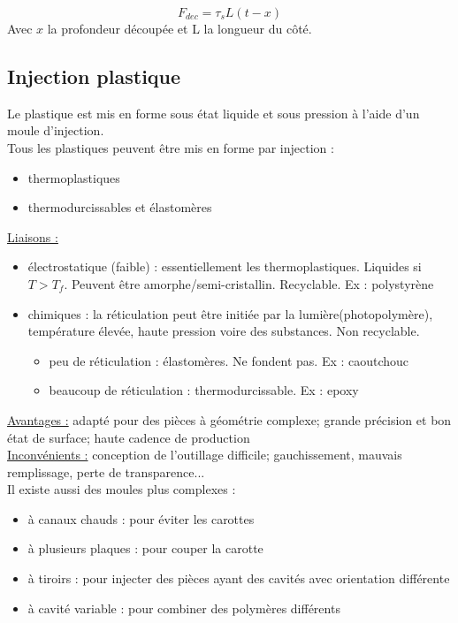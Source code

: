 \documentclass[../main.tex]{subfiles}
\begin{document}
\begin{equation}
    F_{dec} = \tau_s L (t-x)
\end{equation}
Avec $x$ la profondeur découpée et L la longueur du côté.\\

\subsection{Injection plastique}
Le plastique est mis en forme sous état liquide et sous pression à l'aide d'un moule d'injection.\\
Tous les plastiques peuvent être mis en forme par injection : \begin{itemize}
    \item thermoplastiques\\
    \item thermodurcissables et élastomères\\
\end{itemize}

\underline{Liaisons :} \begin{itemize}
    \item électrostatique (faible) : essentiellement les thermoplastiques. Liquides si $T>T_f$. Peuvent être amorphe/semi-cristallin. Recyclable. Ex : polystyrène\\
    \item chimiques : la réticulation peut être initiée par la lumière(photopolymère), température élevée, haute pression voire des substances. Non recyclable. \begin{itemize}
        \item peu de réticulation : élastomères. Ne fondent pas. Ex : caoutchouc\\
        \item beaucoup de réticulation : thermodurcissable. Ex : epoxy
    \end{itemize}
\end{itemize}

\quad \underline{Avantages :} adapté pour des pièces à géométrie complexe; grande précision et bon état de surface; haute cadence de production\\

\quad \underline{Inconvénients :} conception de l'outillage difficile; gauchissement, mauvais remplissage, perte de transparence...\\

Il existe aussi des moules plus complexes : \begin{itemize}
    \item à canaux chauds : pour éviter les carottes\\
    \item à plusieurs plaques : pour couper la carotte\\
    \item à tiroirs : pour injecter des pièces ayant des cavités avec orientation différente\\
    \item à cavité variable : pour combiner des polymères différents\\
\end{itemize}
\end{document}
